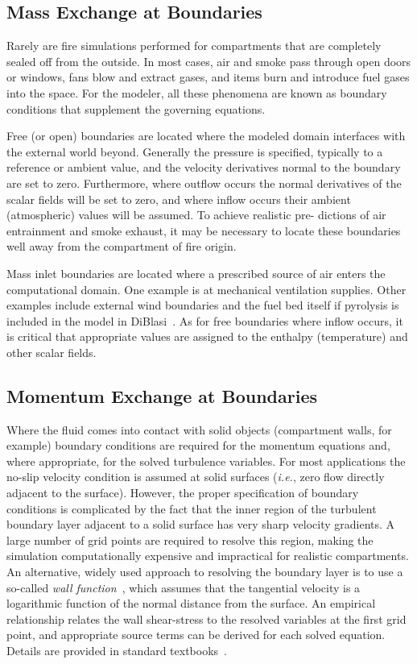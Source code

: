 \documentclass[graybox]{svmult}
\begin{document}
\subsection{Mass Exchange at Boundaries}

Rarely are fire simulations performed for compartments that are completely sealed off from the outside. In most cases, air and smoke pass through open doors or windows, fans blow and extract gases, and items burn and introduce fuel gases into the space. For the modeler, all these phenomena are known as boundary conditions that supplement the governing equations.

Free (or open) boundaries are located where the modeled domain interfaces with the external world beyond. Generally the pressure is specified, typically to a reference or ambient value, and the velocity derivatives normal to the boundary are set to zero. Furthermore, where outflow occurs the normal derivatives of the scalar fields will be set to zero, and where inflow occurs their ambient (atmospheric) values will be assumed. To achieve realistic pre- dictions of air entrainment and smoke exhaust, it may be necessary to locate these boundaries well away from the compartment of fire origin.

Mass inlet boundaries are located where a prescribed source of air enters the computational domain. One example is at mechanical ventilation supplies. Other examples include external wind boundaries and the fuel bed itself if pyrolysis is included in the model in DiBlasi~\cite{DiBlasi}. As for free boundaries where inflow occurs, it is critical that appropriate values are assigned to the enthalpy (temperature) and other scalar fields.

\subsection{Momentum Exchange at Boundaries}

Where the fluid comes into contact with solid objects (compartment walls, for example) boundary conditions are required for the momentum equations and, where appropriate, for the solved turbulence variables. For most applications  the  no-slip  velocity  condition  is  assumed at solid surfaces ({\em i.e.}, zero flow directly adjacent to the surface). However, the proper specification of boundary conditions is complicated by the fact that the inner region of the turbulent boundary layer adjacent to a solid surface has very sharp velocity gradients. A large number of grid points are required to resolve this region, making the simulation computationally expensive and impractical for realistic compartments. An alternative, widely used approach to resolving the boundary layer is to use a so-called {\em wall function}~\cite{Launder}, which assumes that the tangential velocity is a logarithmic function of the normal distance from the surface. An empirical relationship relates the wall shear-stress to the resolved variables at the first grid point, and appropriate source terms can be derived for each solved equation. Details are provided in standard textbooks~\cite{Wilcox}.
\end{document}
